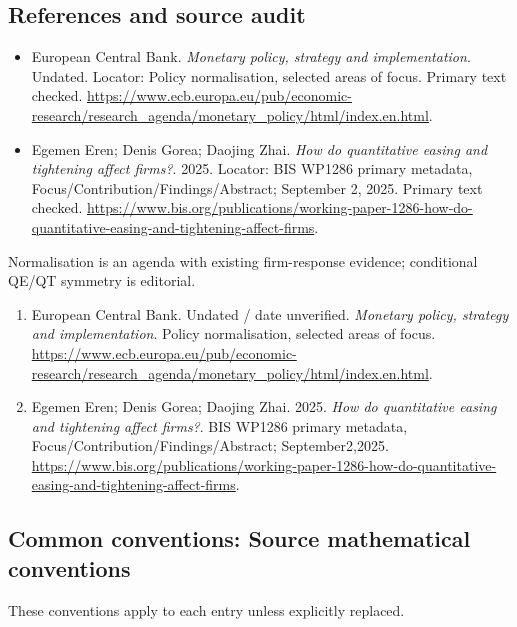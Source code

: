\documentclass[11pt,a4paper]{article}
\begin{document}
\subsection*{References and source audit}
\begin{itemize}
\item European Central Bank. \emph{Monetary policy, strategy and implementation}. Undated. Locator: Policy normalisation, selected areas of focus. Primary text checked. \url{https://www.ecb.europa.eu/pub/economic-research/research_agenda/monetary_policy/html/index.en.html}.
\item Egemen Eren; Denis Gorea; Daojing Zhai. \emph{How do quantitative easing and tightening affect firms?}. 2025. Locator: BIS WP1286 primary metadata, Focus/\allowbreak Contribution/\allowbreak Findings/\allowbreak Abstract; September 2, 2025. Primary text checked. \url{https://www.bis.org/publications/working-paper-1286-how-do-quantitative-easing-and-tightening-affect-firms}.
\end{itemize}
Normalisation is an agenda with existing firm-response evidence; conditional QE/QT symmetry is editorial.
\begin{enumerate}\raggedright
\item\hypertarget{definitions:source:30007527:1}{} European Central Bank. Undated / date unverified. \emph{Monetary policy, strategy and implementation}. Policy normalisation, selected areas of focus.
\url{https://www.ecb.europa.eu/pub/economic-research/research_agenda/monetary_policy/html/index.en.html}.
\item\hypertarget{definitions:source:30007527:2}{} Egemen Eren; Denis Gorea; Daojing Zhai. 2025. \emph{How do quantitative easing and tightening affect firms?}. BIS WP1286 primary metadata, Focus/\allowbreak Contribution/\allowbreak Findings/\allowbreak Abstract; September2,2025.
\url{https://www.bis.org/publications/working-paper-1286-how-do-quantitative-easing-and-tightening-affect-firms}.
\end{enumerate}

\subsection*{Common conventions: Source mathematical conventions}

These conventions apply to each entry unless explicitly replaced.
\end{document}
